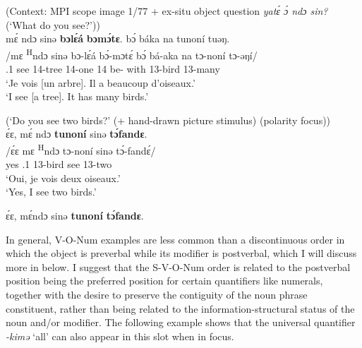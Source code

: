 \documentclass[output=paper,colorlinks,citecolor=brown
]{langscibook}
\begin{document}
\ea
\label{whatseeV-O-Num}
(Context: MPI scope image 1/77 + ex-situ object question \textit{yatɛ́ ɔ́ ndɔ sin?} (`What do you see?')) \\ 
\glll
{\db}mɛ́ ndɔ	sinə \textbf{bɔlɛ́á}	\textbf{bɔmɔ́tɛ}. bɔ́ báka na tunoní tuəŋ.  \\
/mɛ \textsuperscript{H}ndɔ sinə bɔ-lɛ́á	bɔ́-mɔtɛ́	bɔ́ bá-aka na tɔ-noní tɔ-əŋí/ \\
{\db}\SM{}.1\SG{} \PRS{} see 14-tree	14-one	14\SM{} be-\DUR{}	with 13-bird	13-many \\
\glt
`Je vois [un arbre]\textsubscript{\FOC{}}. Il a beaucoup d'oiseaux.' \\`I see [a tree]\textsubscript{\FOC{}}. It has many birds.' \jambox*{[JO 1151] }

\z


\ea \label{twobirdsS-O-V-Num} (`Do you see two birds?' (+ hand-drawn picture stimulus) (polarity focus)) \\
\ea
\glll
{\db}ɛ́ɛ, mɛ́ ndɔ \textbf{tunoní} sinə \textbf{tɔ́fandɛ}. \\
/ɛ́ɛ mɛ \textsuperscript{H}ndɔ tɔ-noní sinə tɔ́-fandɛ́/ \\
{\db}yes \SM{}.1\SG{} \PRS{} 13-bird see 13-two \\
\glt
`Oui, je vois deux oiseaux.' \\ `Yes, I see two birds.' \jambox*{[EO 1408] }

\ex\label{twobirdsSV-O-Num}
ɛ́ɛ, mɛ́ndɔ sinə \textbf{tunoní} \textbf{tɔ́fandɛ}. \jambox*{[EO 1409] }
\z
\z

In general, V-O-Num examples are less common than a discontinuous order in which the object is preverbal while its modifier is postverbal, which I will discuss more in  below.  I suggest that the S-V-O-Num order is related to the postverbal position being the preferred position for certain quantifiers like numerals, together with the desire to preserve the contiguity of the noun phrase constituent, rather than being related to the information-structural status of the noun and/or modifier. The following example shows that the universal quantifier \textit{-kimə} `all' can also appear in this slot when in focus.\largerpage
 
\end{document}
